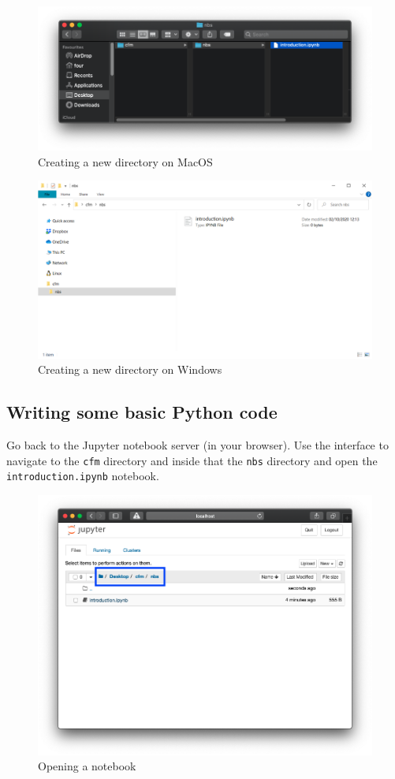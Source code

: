 \begin{figure}[htbp]
\centering
    \includegraphics[width=0.750\linewidth]{assets/new_directory_structure/main.png}
    \caption{Creating a new directory on MacOS}\label{fig:new_directory_structure}
\end{figure}


\begin{figure}[htbp]
\centering
    \includegraphics[width=0.750\linewidth]{assets/new_directory_structure_windows/main.png}
    \caption{Creating a new directory on
    Windows}\label{fig:new_directory_structure_windows}
\end{figure}


\subsection{Writing some basic Python code}
Go back to the Jupyter notebook server (in your browser).
Use the interface to navigate to the \texttt{cfm} directory and inside that the \texttt{nbs}
directory and open the \texttt{introduction.ipynb} notebook.

\begin{figure}[htbp]
\centering
    \includegraphics[width=0.750\linewidth]{assets/opening_notebook/main.png}
    \caption{Opening a notebook}
\end{figure}

